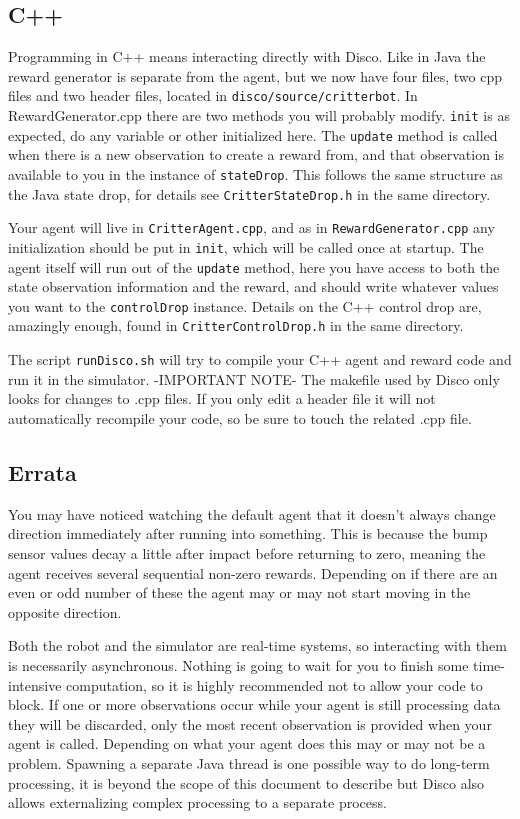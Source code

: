 \documentclass[12pt]{article}
\begin{document}
\subsection{C++}\label{subsec:cpp_agent}

Programming in C++ means interacting directly with Disco.  Like in Java the reward generator is separate from the agent, but we now have four files, two cpp files and two header files, located in \verb+disco/source/critterbot+.  In RewardGenerator.cpp there are two methods you will probably modify.  \verb+init+ is as expected, do any variable or other initialized here.  The \verb+update+ method is called when there is a new observation to create a reward from, and that observation is available to you in the instance of \verb+stateDrop+.  This follows the same structure as the Java state drop, for details see \verb+CritterStateDrop.h+ in the same directory.

Your agent will live in \verb+CritterAgent.cpp+, and as in \verb+RewardGenerator.cpp+ any initialization should be put in \verb+init+, which will be called once at startup.  The agent itself will run out of the \verb+update+ method, here you have access to both the state observation information and the reward, and should write whatever values you want to the \verb+controlDrop+ instance.  Details on the C++ control drop are, amazingly enough, found in \verb+CritterControlDrop.h+ in the same directory.

The script \verb+runDisco.sh+ will try to compile your C++ agent and reward code and run it in the simulator.  -IMPORTANT NOTE-  The makefile used by Disco only looks for changes to .cpp files.  If you only edit a header file it will not automatically recompile your code, so be sure to touch the related .cpp file.

\subsection{Errata}\label{subsec:programming_exercises}

You may have noticed watching the default agent that it doesn't always change direction immediately after running into something.  This is because the bump sensor values decay a little after impact before returning to zero, meaning the agent receives several sequential non-zero rewards.  Depending on if there are an even or odd number of these the agent may or may not start moving in the opposite direction.

Both the robot and the simulator are real-time systems, so interacting with them is necessarily asynchronous.  Nothing is going to wait for you to finish some time-intensive computation, so it is highly recommended not to allow your code to block.  If one or more observations occur while your agent is still processing data they will be discarded, only the most recent observation is provided when your agent is called.  Depending on what your agent does this may or may not be a problem.  Spawning a separate Java thread is one possible way to do long-term processing, it is beyond the scope of this document to describe but Disco also allows externalizing complex processing to a separate process.
\end{document}
